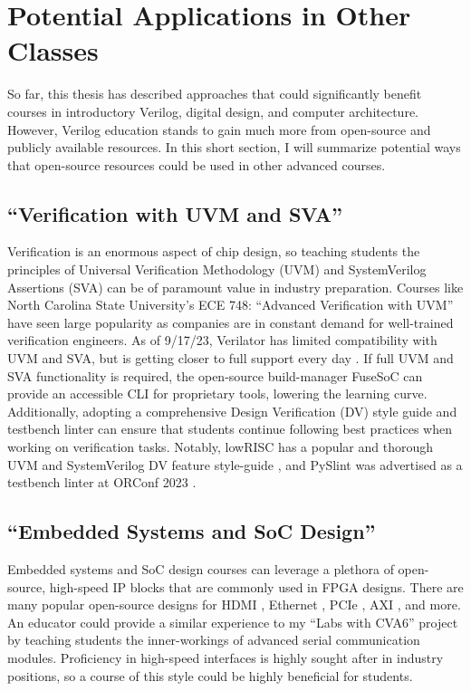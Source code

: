 
\chapter{Potential Applications in Other Classes}
\label{chapter:other_classes}

So far, this thesis has described approaches that could significantly benefit courses in introductory Verilog, digital design, and computer architecture. However, Verilog education stands to gain much more from open-source and publicly available resources. In this short section, I will summarize potential ways that open-source resources could be used in other advanced courses.

\section{\enquote{Verification with UVM and SVA}}

Verification is an enormous aspect of chip design, so teaching students the principles of Universal Verification Methodology (UVM) and SystemVerilog Assertions (SVA) can be of paramount value in industry preparation. Courses like North Carolina State University's ECE 748: \enquote{Advanced Verification with UVM} have seen large popularity as companies are in constant demand for well-trained verification engineers. As of 9/17/23, Verilator has limited compatibility with UVM and SVA, but is getting closer to full support every day \cite{VerilatorUVM, BieganskiORConf, VerilatorSVA}. If full UVM and SVA functionality is required, the open-source build-manager FuseSoC can provide an accessible CLI for proprietary tools, lowering the learning curve. Additionally, adopting a comprehensive Design Verification (DV) style guide and testbench linter can ensure that students continue following best practices when working on verification tasks. Notably, lowRISC has a popular and thorough UVM and SystemVerilog DV feature style-guide \cite{lowRISCstyleguides}, and PySlint was advertised as a testbench linter at ORConf 2023 \cite{paulORConf}.

\section{\enquote{Embedded Systems and SoC Design}}

Embedded systems and SoC design courses can leverage a plethora of open-source, high-speed IP blocks that are commonly used in FPGA designs. There are many popular open-source designs for HDMI \cite{hdlutilhdmiGitHub, projfdisplaycontrollerGitHub, cliffordwolfSimpleVOutGitHub}, Ethernet \cite{alexforencichverilogethernetGitHub}, PCIe \cite{alexforencichverilogpcieGitHub, enjoydigitallitepcieGitHub}, AXI \cite{pulpplatformaxiGitHub, alexforencichverilogaxiGitHub}, and more. An educator could provide a similar experience to my \enquote{Labs with CVA6} project by teaching students the inner-workings of advanced serial communication modules. Proficiency in high-speed interfaces is highly sought after in industry positions, so a course of this style could be highly beneficial for students.

